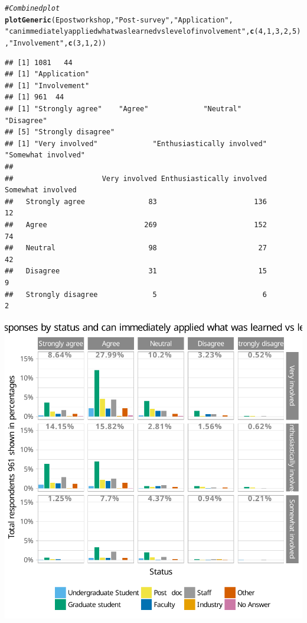 \documentclass{article}\usepackage[]{graphicx}\usepackage[]{color}
\makeatletter
\newcommand{\hlnum}[1]{\textcolor[rgb]{0.686,0.059,0.569}{#1}}%
\newcommand{\hlstr}[1]{\textcolor[rgb]{0.192,0.494,0.8}{#1}}%
\newcommand{\hlcom}[1]{\textcolor[rgb]{0.678,0.584,0.686}{\textit{#1}}}%
\newcommand{\hlstd}[1]{\textcolor[rgb]{0.345,0.345,0.345}{#1}}%
\newcommand{\hlkwd}[1]{\textcolor[rgb]{0.737,0.353,0.396}{\textbf{#1}}}%
\newenvironment{kframe}{%
 \def\at@end@of@kframe{}%
 \ifinner\ifhmode%
  \def\at@end@of@kframe{\end{minipage}}%
  \begin{minipage}{\columnwidth}%
 \fi\fi%
 \def\FrameCommand##1{\hskip\@totalleftmargin \hskip-\fboxsep
 \colorbox{shadecolor}{##1}\hskip-\fboxsep
     \hskip-\linewidth \hskip-\@totalleftmargin \hskip\columnwidth}%
 \MakeFramed {\advance\hsize-\width
   \@totalleftmargin\z@ \linewidth\hsize
   \@setminipage}}%
 {\par\unskip\endMakeFramed%
 \at@end@of@kframe}
\newenvironment{knitrout}{}{} %
\makeatother
\begin{document}
\begin{knitrout}
\begin{kframe}\begin{alltt}
\hlcom{# Combined plot}
\hlkwd{plotGeneric}\hlstd{(Epostworkshop,} \hlstr{"Post-survey"}\hlstd{,} \hlstr{"Application"} \hlstd{,}
            \hlstr{"can immediately applied what was learned vs level of involvement"}\hlstd{,}  \hlkwd{c}\hlstd{(}\hlnum{4}\hlstd{,}\hlnum{1}\hlstd{,}\hlnum{3}\hlstd{,}\hlnum{2}\hlstd{,}\hlnum{5}\hlstd{),}\hlstr{"Involvement"}\hlstd{,} \hlkwd{c}\hlstd{(}\hlnum{3}\hlstd{,}\hlnum{1}\hlstd{,}\hlnum{2}\hlstd{))}
\end{alltt}
\begin{verbatim}
## [1] 1081   44
## [1] "Application"
## [1] "Involvement"
## [1] 961  44
## [1] "Strongly agree"    "Agree"             "Neutral"           "Disagree"         
## [5] "Strongly disagree"
## [1] "Very involved"             "Enthusiastically involved" "Somewhat involved"        
##                    
##                     Very involved Enthusiastically involved Somewhat involved
##   Strongly agree               83                       136                12
##   Agree                       269                       152                74
##   Neutral                      98                        27                42
##   Disagree                     31                        15                 9
##   Strongly disagree             5                         6                 2
\end{verbatim}
\end{kframe}

{\centering \includegraphics[width=.6\linewidth]{figure/calls-Rnwplotting-postsurvey-data-18} 

}



\end{knitrout}
\end{document}
